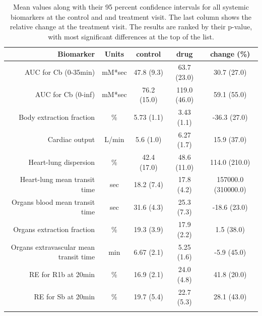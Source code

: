 \documentclass{epflreport}%
\begin{document}
\begin{longtable}{rcccc}%
\hline%
Biomarker&Units&control&drug&change (\%)\\%
\hline%
AUC for Cb (0{-}35min)&mM*sec&47.8 (9.3) &63.7 (23.0) &30.7 (27.0) \\%
AUC for Cb (0{-}inf)&mM*sec&76.2 (15.0) &119.0 (46.0) &59.1 (55.0) \\%
Body extraction fraction&\%&5.73 (1.1) &3.43 (1.1) &{-}36.3 (27.0) \\%
Cardiac output&L/min&5.6 (1.0) &6.27 (1.7) &15.9 (37.0) \\%
Heart{-}lung dispersion&\%&42.4 (17.0) &48.6 (11.0) &114.0 (210.0) \\%
Heart{-}lung mean transit time&sec&18.2 (7.4) &17.8 (4.2) &157000.0 (310000.0) \\%
Organs blood mean transit time&sec&31.6 (4.3) &25.3 (7.3) &{-}18.6 (23.0) \\%
Organs extraction fraction&\%&19.3 (3.9) &17.9 (2.2) &1.5 (38.0) \\%
Organs extravascular mean transit time&min&6.67 (2.1) &5.25 (1.6) &{-}5.9 (45.0) \\%
RE for R1b at 20min&\%&16.9 (2.1) &24.0 (4.8) &41.8 (20.0) \\%
RE for Sb at 20min&\%&19.7 (5.4) &22.7 (5.3) &28.1 (43.0) \\%
\hline%
\caption{Mean values along with their 95 percent confidence intervals for all systemic biomarkers at the control and and treatment visit. The last column shows the relative change at the treatment visit. The results are ranked by their p-value, with most significant differences at the top of the list.} \\%
\end{longtable}%
\end{document}
